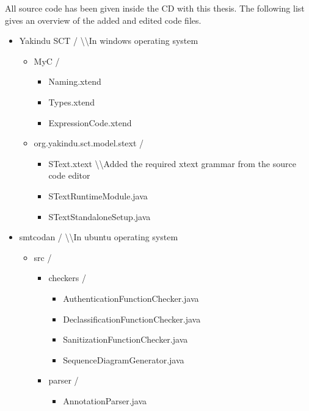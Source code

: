 All source code has been given inside the CD with this thesis. The following list gives an overview of the added and edited code files.
\begin{itemize}
	\item Yakindu SCT / \qquad \textbackslash \textbackslash In windows operating system 
	       \begin{itemize}
	       	 \item MyC /
		       	  \begin{itemize}
		       	  	\item Naming.xtend
		       	  	\item Types.xtend
		       	  	\item ExpressionCode.xtend
		       	  \end{itemize}
			    \item org.yakindu.sct.model.stext /	 \begin{itemize}
			      	\item SText.xtext \hspace{.5em}  \textbackslash \textbackslash Added the required xtext grammar from the source code editor 
			      	\item STextRuntimeModule.java
			      	\item STextStandaloneSetup.java
			     \end{itemize}      	  	
	       \end{itemize}
	  \item smtcodan /  \qquad \textbackslash \textbackslash In ubuntu operating system 
	       \begin{itemize}
	       	\item src /
	       	    \begin{itemize}	       	    
			       	\item checkers /
			       	   \begin{itemize}
			       	   	\item AuthenticationFunctionChecker.java
			       	   	\item DeclassificationFunctionChecker.java
			       	   	\item SanitizationFunctionChecker.java	       	   	
			       	   	\item SequenceDiagramGenerator.java 	   	     		
			       	   \end{itemize} 
			       	 \item parser /
			       	    \begin{itemize}
			       	    	\item AnnotationParser.java

\end{itemize}
\end{itemize}
\end{itemize}
\end{itemize}

